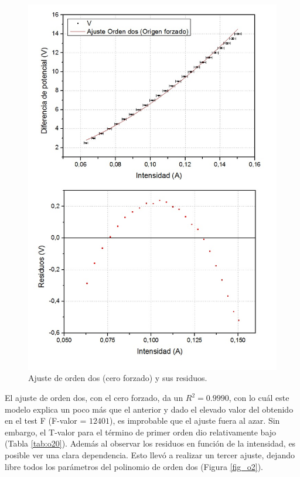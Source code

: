 \documentclass[twoside,twocolumn,a4paper]{article}
\begin{document}
\begin{figure}[h!]
\includegraphics[width=\linewidth]{fig_o2cero.jpg}
\caption{Ajuste de orden dos (cero forzado) y sus residuos.}
\label{fig:o2cero}
\end{figure}

El ajuste de orden dos, con el cero forzado, da un $R^2 = 0.9990$, con lo cu\'al este modelo explica un poco m\'as que el anterior y dado el elevado valor del obtenido en el test F (F-valor = $12401$), es improbable que el ajuste fuera al azar. Sin embargo, el T-valor para el t\'ermino de primer orden dio relativamente bajo (Tabla \ref{tab:o20}). Adem\'as al observar los residuos en funci\'on de la intensidad, es posible ver una clara dependencia. Esto llev\'o a realizar un tercer ajuste, dejando libre todos los par\'ametros del polinomio de orden dos (Figura \ref{fig_o2}).\par
\end{document}

